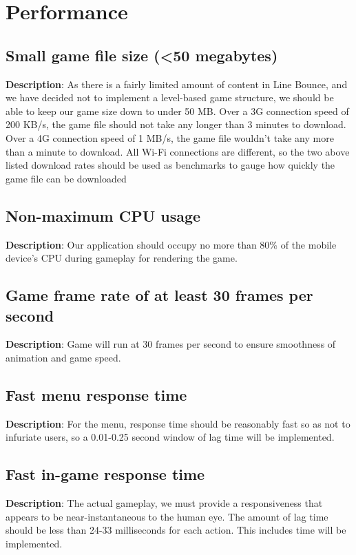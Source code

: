 \section{Performance}
\renewcommand\thesubsection{PER-%
\ifnum\value{subsection}<10 0\fi
\arabic{subsection}}
\subsection{Small game file size (\textless50 megabytes)}
\textbf{Description}: As there is a fairly limited amount of content in Line
Bounce, and we have decided not to implement a level-based game structure,
we should be able to keep our game size down to under 50 MB. Over
a 3G connection speed of 200 KB/s, the game file should not take any
longer than 3 minutes to download. Over a 4G connection speed of 1
MB/s, the game file wouldn\textquoteright{}t take any more than a
minute to download. All Wi-Fi connections are different, so the two
above listed download rates should be used as benchmarks to gauge
how quickly the game file can be downloaded

\subsection{Non-maximum CPU usage}
\textbf{Description}: Our application should occupy no more than 80\% of the
mobile device\textquoteright{}s CPU during gameplay for rendering
the game. 

\subsection{Game frame rate of at least 30 frames per second}
\textbf{Description}: Game will run at 30 frames per second to ensure smoothness
of animation and game speed.

\subsection{Fast menu response time}
\textbf{Description}: For the menu, response time should be reasonably fast
so as not to infuriate users, so a 0.01-0.25 second window of lag
time will be implemented.

\subsection{Fast in-game response time}
\textbf{Description}: The actual gameplay, we must provide a responsiveness
that appears to be near-instantaneous to the human eye. The amount of lag time
should be less than 24-33 milliseconds for each action. This includes
time will be implemented.

